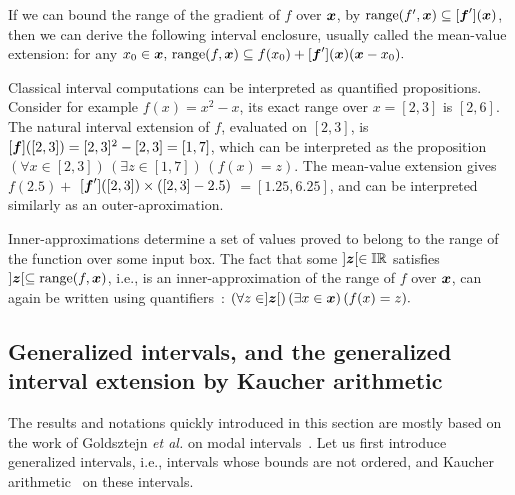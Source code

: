 \documentclass{sig-alternate-05-2015}
\DeclareMathOperator{\range}{range}
\def\I{{\Bbb I \Bbb R}}
\begin{document}
If we can bound the range of the gradient of $f$ over $\x$, by $\mbox{range}(f',\x) \subseteq [\f'](\x)$, then we can 
derive the following interval enclosure, usually called the mean-value extension: for any  $x_0 \in \x, \,    \mbox{range}(f,\x)  \subseteq f(x_0) +  [\f'](\x) (\x - x_0). $

Classical interval computations can be interpreted as quantified 
propositions. Consider for example $f(x)=x^2-x$, its exact range over $x=[2,3]$ is $[2,6]$.
The natural interval extension of $f$, evaluated on $[2,3]$, is 
$[\f]([2,3])=[2,3]^2-[2,3]=[1,7]$, which can be interpreted as the proposition 
$ (\forall x \in [2,3]) \, (\exists z \in [1,7]) \, (f(x)=z).    $
The mean-value extension gives
$f(2.5) + $ $[\f']([2, 3]) \times ([2, 3] - 2.5)$ $ = [1.25, 6.25]$, and can be interpreted similarly as an outer-aproximation.

Inner-approximations determine a set of values proved to belong to the range of the function over some input box. 
The fact that some $]\z[ \in \I$ satisfies $]\z[ \subseteq \range(f,\x)$, i.e., is an inner-approximation of the range 
of $f$ over $\x$, can again be written using quantifiers~: 
$ (\forall z \in ]\z[) \, (\exists x \in \x) \, (f(x)=z).    $

\subsection{Generalized intervals, and the generalized interval extension by Kaucher arithmetic}
\label{Kaucherar}

The results and notations quickly introduced in this section are mostly based on the work of Goldsztejn {\it et al.} 
on modal intervals~\cite{gold1}. 
Let us first introduce generalized intervals, i.e., intervals whose
bounds are not ordered, and Kaucher arithmetic~\cite{Kaucher} on these intervals.  
\end{document}
